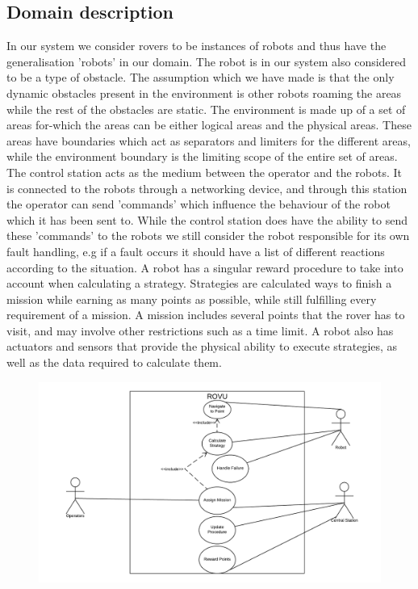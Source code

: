 \subsection*{Domain description}
In our system we consider rovers to be instances of robots and thus have the generalisation 'robots' in our domain. 
The robot is in our system also considered to be a type of obstacle. The assumption which we have made is that the only dynamic obstacles present in the environment is other robots roaming the areas while the rest of the obstacles are static.\newline
The environment is made up of a set of areas for-which the areas can be either logical areas and the physical areas. These areas have boundaries which act as separators and limiters for the different areas, while the environment boundary is the limiting scope of the entire set of areas.\newline
The control station acts as the medium between the operator and the robots. It is connected to the robots through a networking device, and through this station the operator can send 'commands' which influence the behaviour of the robot which it has been sent to. While the control station does have the ability to send these 'commands' to the robots we still consider the robot responsible for its own fault handling, e.g if a fault occurs it should have a list of different reactions according to the situation.\newline 
A robot has a singular reward procedure to take into account when calculating a strategy. Strategies are calculated ways to finish a mission while earning as many points as possible, while still fulfilling every requirement of a mission.
A mission includes several points that the rover has to visit, and may involve other restrictions such as a time limit. A robot also has actuators and sensors that provide the physical ability to execute strategies, as well as the data required to calculate them.

\newpage
\begin{figure}
\includegraphics[width=22cm, angle=-90]{docs/domain/use_cases/use_case_diagram.png}
\end{figure}

